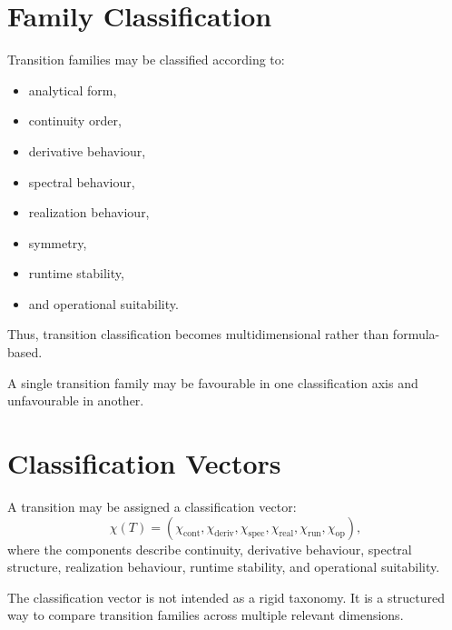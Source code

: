 \section{Family Classification}

\begin{definition}
\label{def:transition-family-classification}
Transition families may be classified according to:
\begin{itemize}
\item analytical form,
\item continuity order,
\item derivative behaviour,
\item spectral behaviour,
\item realization behaviour,
\item symmetry,
\item runtime stability,
\item and operational suitability.
\end{itemize}
\end{definition}

Thus, transition classification becomes multidimensional rather than
formula-based.

A single transition family may be favourable in one classification axis
and unfavourable in another.

\section{Classification Vectors}

\begin{definition}
\label{def:classification-vector}
A transition may be assigned a classification vector:
\[
\chi(T)
=
(
\chi_{\mathrm{cont}},
\chi_{\mathrm{deriv}},
\chi_{\mathrm{spec}},
\chi_{\mathrm{real}},
\chi_{\mathrm{run}},
\chi_{\mathrm{op}}
),
\]
where the components describe continuity, derivative behaviour,
spectral structure, realization behaviour, runtime stability, and
operational suitability.
\end{definition}

The classification vector is not intended as a rigid taxonomy. It is a
structured way to compare transition families across multiple relevant
dimensions.

